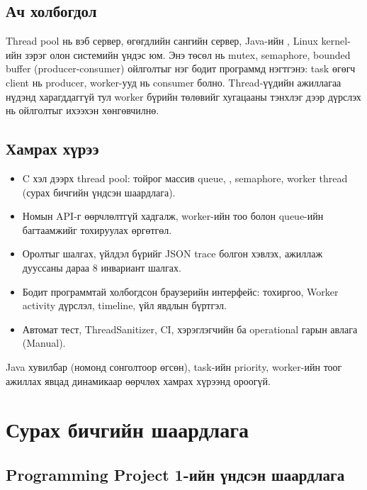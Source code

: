\documentclass[12pt,a4paper]{article}
\begin{document}
\subsection{Ач холбогдол}

Thread pool нь вэб сервер, өгөгдлийн сангийн сервер, Java-ийн , Linux kernel-ийн  зэрэг олон системийн үндэс юм. Энэ төсөл нь mutex, semaphore, bounded buffer (producer-consumer) ойлголтыг нэг бодит программд нэгтгэнэ: task өгөгч client нь producer, worker-ууд нь consumer болно. Thread-үүдийн ажиллагаа нүдэнд харагддаггүй тул worker бүрийн төлөвийг хугацааны тэнхлэг дээр дүрслэх нь ойлголтыг ихээхэн хөнгөвчилнө.

\subsection{Хамрах хүрээ}

\begin{itemize}
  \item C хэл дээрх thread pool: тойрог массив queue, ,  semaphore, worker thread (сурах бичгийн үндсэн шаардлага).
  \item Номын API-г өөрчлөлтгүй хадгалж, worker-ийн тоо болон queue-ийн багтаамжийг тохируулах өргөтгөл.
  \item Оролтыг шалгах, үйлдэл бүрийг JSON trace болгон хэвлэх, ажиллаж дууссаны дараа 8 инвариант шалгах.
  \item Бодит программтай холбогдсон браузерийн интерфейс: тохиргоо, Worker activity дүрслэл, timeline, үйл явдлын бүртгэл.
  \item Автомат тест, ThreadSanitizer, CI, хэрэглэгчийн ба operational гарын авлага (Manual).
\end{itemize}

Java хувилбар (номонд сонголтоор өгсөн), task-ийн priority, worker-ийн тоог ажиллах явцад динамикаар өөрчлөх хамрах хүрээнд ороогүй.

\section{Сурах бичгийн шаардлага}

\subsection{Programming Project 1-ийн үндсэн шаардлага}
\end{document}
